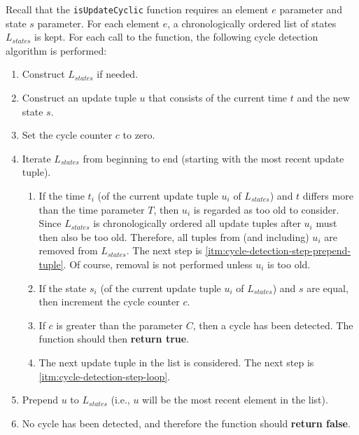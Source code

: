 \documentclass[a4paper,11pt]{kth-mag}
\newcommand{\code}[1]{\texttt{#1}}
\begin{document}
        Recall that the \code{isUpdateCyclic} function requires an element $e$ parameter and state $s$ parameter.
        For each element $e$, a chronologically ordered list of states $L_{states}$ is kept.
        For each call to the function, the following cycle detection algorithm is performed:
        \begin{enumerate}
          \item Construct $L_{states}$ if needed.
          \item Construct an update tuple $u$ that consists of the current time $t$ and the new state $s$.
          \item Set the cycle counter $c$ to zero.
          \item Iterate $L_{states}$ from beginning to end (starting with the most recent update tuple).
          \begin{enumerate}
            \item\label{itm:cycle-detection-step-loop}
              If the time $t_i$ (of the current update tuple $u_i$ of $L_{states}$) and $t$ differs more than the time parameter $T$, then $u_i$ is regarded as too old to consider.
              Since $L_{states}$ is chronologically ordered all update tuples after $u_i$ must then also be too old.
              Therefore, all tuples from (and including) $u_i$ are removed from $L_{states}$.
              The next step is \ref{itm:cycle-detection-step-prepend-tuple}.
              Of course, removal is not performed unless $u_i$ is too old.
            \item If the state $s_i$ (of the current update tuple $u_i$ of $L_{states}$) and $s$ are equal, then increment the cycle counter $c$.
            \item If $c$ is greater than the parameter $C$, then a cycle has been detected. The function should then \textbf{return true}.
            \item The next update tuple in the list is considered. The next step is \ref{itm:cycle-detection-step-loop}.
          \end{enumerate}
          \item\label{itm:cycle-detection-step-prepend-tuple} Prepend $u$ to $L_{states}$ (i.e., $u$ will be the most recent element in the list).
          \item No cycle has been detected, and therefore the function should \textbf{return false}.
        \end{enumerate}

\end{document}
